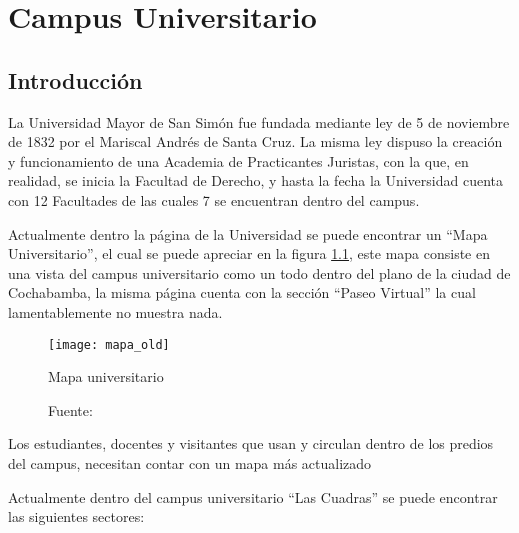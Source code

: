 \chapter{Campus Universitario}
\label{chap:Campus Universitario}

\section{Introducción}

La Universidad Mayor de San Simón fue fundada mediante ley de 5 de noviembre de 1832 por el Mariscal Andrés de Santa Cruz. La misma ley dispuso la creación y funcionamiento de una Academia de Practicantes Juristas, con la que, en realidad, se inicia la Facultad de Derecho, y hasta la fecha la Universidad cuenta con 12 Facultades de las cuales 7 se encuentran dentro del campus. \cite{umss_history}

Actualmente dentro la página de la Universidad se puede encontrar un ``Mapa Universitario'', el cual se puede apreciar en la figura \ref{fig:mapa_old}, este mapa consiste en una vista del campus universitario como un todo dentro del plano de la ciudad de Cochabamba, la misma página cuenta con la sección ``Paseo Virtual'' la cual lamentablemente no muestra nada.\\

\begin{figure}[H]
  \begin{center}
    \texttt{[image: mapa\_old]}
    \caption{Mapa universitario}
    \label{fig:mapa_old}
    \caption*{Fuente: \cite{umss_mapa}}
  \end{center}
\end{figure}


Los estudiantes, docentes y visitantes que usan y circulan dentro de los predios del campus, necesitan contar con un mapa más actualizado


Actualmente dentro del campus universitario ``Las Cuadras'' se puede encontrar las siguientes sectores:

